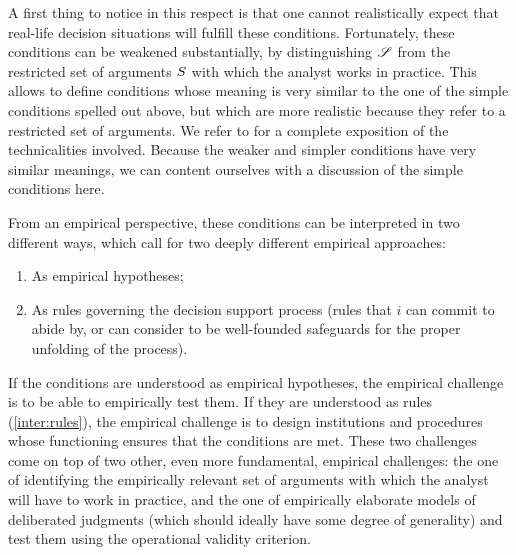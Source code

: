 \documentclass[version=3.21, pagesize, twoside=off, bibliography=totoc, DIV=calc, fontsize=12pt, a4paper, french, english]{scrartcl}
\begin{document}
A first thing to notice in this respect is that one cannot realistically expect that real-life decision situations will fulfill these conditions. Fortunately, these conditions can be weakened substantially, by distinguishing $\mathscr{S}$ from the restricted set of arguments $S$ with which the analyst works in practice. This allows to define conditions whose meaning is very similar to the one of the simple conditions spelled out above, but which are more realistic because they refer to a restricted set of arguments. We refer to \citet{cailloux_formal_2019} for a complete exposition of the technicalities involved. Because the weaker and simpler conditions have very similar meanings, we can content ourselves with a discussion of the simple conditions here. 

From an empirical perspective, these conditions can be interpreted in two different ways, which call for two deeply different empirical approaches:
\begin{enumerate}[label=\emph{\roman*}, ref=\emph{\roman*}]
		\item \label{inter:empir} As empirical hypotheses;
	\item \label{inter:rules} As rules governing the decision support process (rules that $i$ can commit to abide by, or can consider to be well-founded safeguards for the proper unfolding of the process).
\end{enumerate}

If the conditions are understood as empirical hypotheses, the empirical challenge is to be able to empirically test them. If they are understood as rules (\ref{inter:rules}), the empirical challenge is to design institutions and procedures whose functioning ensures that the conditions are met. These two challenges come on top of two other, even more fundamental, empirical challenges: the one of identifying the empirically relevant set of arguments with which the analyst will have to work in practice, and the one of empirically elaborate models of deliberated judgments (which should ideally have some degree of generality)  and test them using the operational validity criterion.
\end{document}

